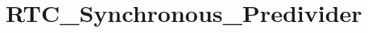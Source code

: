 \hypertarget{group___r_t_c___synchronous___predivider}{\section{R\-T\-C\-\_\-\-Synchronous\-\_\-\-Predivider}
\label{group___r_t_c___synchronous___predivider}
}
